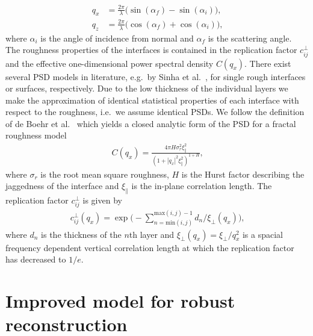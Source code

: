 \documentclass{iucr}              %
\begin{document}
\begin{align}
	q_x &= \frac{2 \pi}{\lambda} \big(\sin(\alpha_f) - \sin(\alpha_i)\big) \text{,}\\
	q_z &= \frac{2\pi}{\lambda} \big(\cos(\alpha_f) + \cos(\alpha_i)\big) \text{,} 
\end{align}
where $\alpha_i$ is the angle of incidence from normal and $\alpha_f$ is the scattering angle.
The roughness properties of the interfaces is contained in the replication factor $c_{ij}^\perp$ \cite{spiller1993multilayer} and the effective one-dimensional power spectral density $C(q_x)$. There exist several PSD models in literature, e.g.~by Sinha et al.~\cite{PhysRevB.38.2297}, for single rough interfaces or surfaces, respectively. Due to the low thickness of the individual layers we make the approximation of identical statistical properties of each interface with respect to the roughness, i.e.~we assume identical PSDs. We follow the definition of de Boehr et al.~\cite{deBoerLateralCorrelation,PhysRevB.51.5297} which yields a closed analytic form of the PSD for a fractal roughness model
\begin{align}
    C(q_x) = \frac{4 \pi H \sigma_r^2 \xi_\parallel^2}{(1+|q_x|^2\xi_\parallel^2)^{1+H}} \text{,} \label{eqn:psd} 
\end{align}
where $\sigma_r$ is the root mean square roughness, $H$ is the Hurst factor describing the jaggedness of the interface and $\xi_\parallel$ is the in-plane correlation length. The replication factor $c_{ij}^\perp$ is given by
\begin{align}
c_{ij}^\perp(q_x) =  \exp\Bigg(-\sum \limits_{n = \text{min}(i,j)}^{\text{max}(i,j)-1}d_n/\xi_\perp(q_x) \Bigg)\text{,}
\end{align}
where $d_n$ is the thickness of the $n$th layer and $\xi_\perp(q_x) = \xi_\perp/q_x^2$ is a spacial frequency dependent vertical correlation length at which the replication factor has decreased to $1/e$.


\section{Improved model for robust reconstruction} \label{sec:model}
\end{document}
